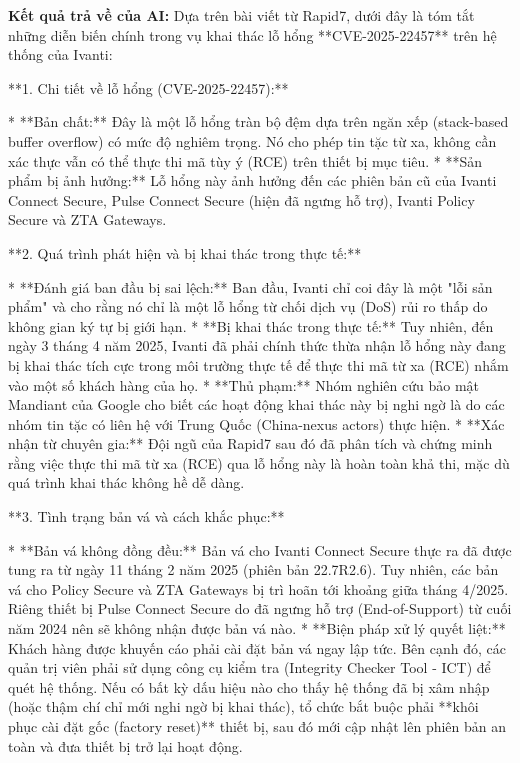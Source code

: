 \textbf{Kết quả trả về của AI:}
Dựa trên bài viết từ Rapid7, dưới đây là tóm tắt những diễn biến chính trong vụ khai thác lỗ hổng **CVE-2025-22457** trên hệ thống của Ivanti:

**1. Chi tiết về lỗ hổng (CVE-2025-22457):**

* **Bản chất:** Đây là một lỗ hổng tràn bộ đệm dựa trên ngăn xếp (stack-based buffer overflow) có mức độ nghiêm trọng. Nó cho phép tin tặc từ xa, không cần xác thực vẫn có thể thực thi mã tùy ý (RCE) trên thiết bị mục tiêu.
* **Sản phẩm bị ảnh hưởng:** Lỗ hổng này ảnh hưởng đến các phiên bản cũ của Ivanti Connect Secure, Pulse Connect Secure (hiện đã ngưng hỗ trợ), Ivanti Policy Secure và ZTA Gateways.

**2. Quá trình phát hiện và bị khai thác trong thực tế:**

* **Đánh giá ban đầu bị sai lệch:** Ban đầu, Ivanti chỉ coi đây là một "lỗi sản phẩm" và cho rằng nó chỉ là một lỗ hổng từ chối dịch vụ (DoS) rủi ro thấp do không gian ký tự bị giới hạn.
* **Bị khai thác trong thực tế:** Tuy nhiên, đến ngày 3 tháng 4 năm 2025, Ivanti đã phải chính thức thừa nhận lỗ hổng này đang bị khai thác tích cực trong môi trường thực tế để thực thi mã từ xa (RCE) nhắm vào một số khách hàng của họ.
* **Thủ phạm:** Nhóm nghiên cứu bảo mật Mandiant của Google cho biết các hoạt động khai thác này bị nghi ngờ là do các nhóm tin tặc có liên hệ với Trung Quốc (China-nexus actors) thực hiện.
* **Xác nhận từ chuyên gia:** Đội ngũ của Rapid7 sau đó đã phân tích và chứng minh rằng việc thực thi mã từ xa (RCE) qua lỗ hổng này là hoàn toàn khả thi, mặc dù quá trình khai thác không hề dễ dàng.

**3. Tình trạng bản vá và cách khắc phục:**

* **Bản vá không đồng đều:** Bản vá cho Ivanti Connect Secure thực ra đã được tung ra từ ngày 11 tháng 2 năm 2025 (phiên bản 22.7R2.6). Tuy nhiên, các bản vá cho Policy Secure và ZTA Gateways bị trì hoãn tới khoảng giữa tháng 4/2025. Riêng thiết bị Pulse Connect Secure do đã ngưng hỗ trợ (End-of-Support) từ cuối năm 2024 nên sẽ không nhận được bản vá nào.
* **Biện pháp xử lý quyết liệt:** Khách hàng được khuyến cáo phải cài đặt bản vá ngay lập tức. Bên cạnh đó, các quản trị viên phải sử dụng công cụ kiểm tra (Integrity Checker Tool - ICT) để quét hệ thống. Nếu có bất kỳ dấu hiệu nào cho thấy hệ thống đã bị xâm nhập (hoặc thậm chí chỉ mới nghi ngờ bị khai thác), tổ chức bắt buộc phải **khôi phục cài đặt gốc (factory reset)** thiết bị, sau đó mới cập nhật lên phiên bản an toàn và đưa thiết bị trở lại hoạt động.


